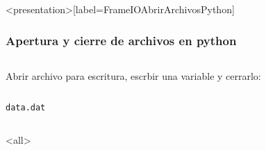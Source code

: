 \begin{frame}<presentation>[label=FrameIOAbrirArchivosPython]
\frametitle{Apertura y cierre de archivos en python}

\begin{columns}[T]
\hfill Abrir archivo para escritura, escrbir una variable y cerrarlo:
    
\end{columns}

    \begin{columns}[T]
        \hfill \texttt{data.dat}
        
    \end{columns}

\end{frame}

\mode<all>
